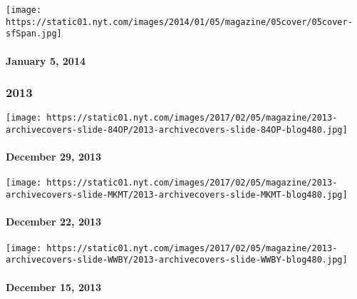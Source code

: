 \href{http://www.nytimes.com/indexes/2014/01/06/magazine/index.html}{}

\texttt{[image: https://static01.nyt.com/images/2014/01/05/magazine/05cover/05cover-sfSpan.jpg]}

\hypertarget{january-5-2014}{%
\paragraph{January 5, 2014}\label{january-5-2014}}

\hypertarget{2013}{%
\subsubsection{2013}\label{2013}}

\href{http://www.nytimes.com/indexes/2013/12/29/magazine/index.html}{}

\texttt{[image: https://static01.nyt.com/images/2017/02/05/magazine/2013-archivecovers-slide-84OP/2013-archivecovers-slide-84OP-blog480.jpg]}

\hypertarget{december-29-2013}{%
\paragraph{December 29, 2013}\label{december-29-2013}}

\href{http://www.nytimes.com/indexes/2013/12/22/magazine/index.html}{}

\texttt{[image: https://static01.nyt.com/images/2017/02/05/magazine/2013-archivecovers-slide-MKMT/2013-archivecovers-slide-MKMT-blog480.jpg]}

\hypertarget{december-22-2013}{%
\paragraph{December 22, 2013}\label{december-22-2013}}

\href{http://www.nytimes.com/indexes/2013/12/15/magazine/index.html}{}

\texttt{[image: https://static01.nyt.com/images/2017/02/05/magazine/2013-archivecovers-slide-WWBY/2013-archivecovers-slide-WWBY-blog480.jpg]}

\hypertarget{december-15-2013}{%
\paragraph{December 15, 2013}\label{december-15-2013}}

\href{http://www.nytimes.com/indexes/2013/12/08/magazine/index.html}{}

